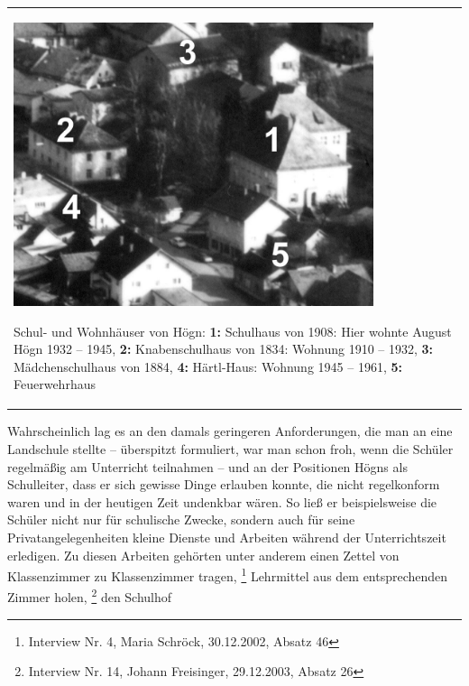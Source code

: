 \begin{center}
\begin{minipage}{10.931cm}
\begin{flushleft}
\tablefirsthead{}
\tablehead{}
\tabletail{}
\tablelasttail{}
\begin{supertabular}{m{10.731cm}}

\includegraphics[width=10.548cm,height=8.313cm]{pictures/zulassungsarbeit-img030.jpg}

Schul- und Wohnhäuser von Högn:
\textbf{1:} Schulhaus von 1908: Hier wohnte August Högn 1932 – 1945,
\textbf{2:} Knabenschulhaus von 1834: Wohnung 1910 – 1932, \textbf{3:}
Mädchenschulhaus von 1884, \textbf{4:} Härtl-Haus: Wohnung 1945 – 1961,
\textbf{5:} Feuerwehrhaus\\
\end{supertabular}
\end{flushleft}
\end{minipage}
\end{center}
Wahrscheinlich lag es an den damals geringeren Anforderungen, die man an
eine Landschule stellte – überspitzt formuliert, war man schon froh,
wenn die Schüler regelmäßig am Unterricht teilnahmen – und an der
Positionen Högns als Schulleiter, dass er sich gewisse Dinge erlauben
konnte, die nicht regelkonform waren und in der heutigen Zeit undenkbar
wären. So ließ er beispielsweise die Schüler nicht nur für schulische
Zwecke, sondern auch für seine Privatangelegenheiten kleine Dienste und
Arbeiten während der Unterrichtszeit erledigen. Zu diesen Arbeiten
gehörten unter anderem einen Zettel von Klassenzimmer zu Klassenzimmer
tragen, \footnote{Interview Nr. 4, Maria Schröck, 30.12.2002, Absatz
46} Lehrmittel aus dem entsprechenden Zimmer holen, \footnote{Interview
Nr. 14, Johann Freisinger, 29.12.2003, Absatz 26} den Schulhof
